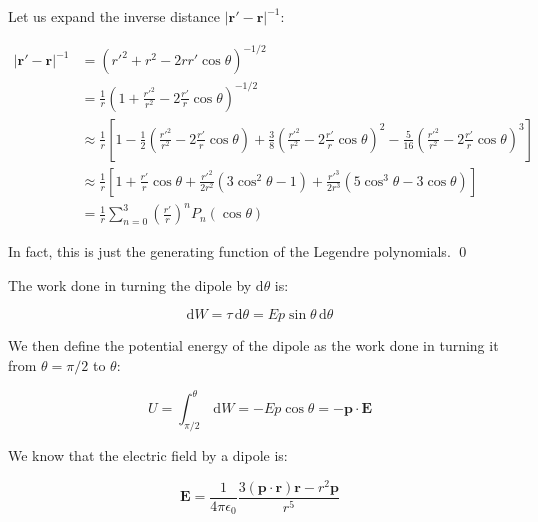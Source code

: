\documentclass[12pt]{article}
\begin{document}
Let us expand the inverse distance $\left\lvert \mathbf{r}' - \mathbf{r} \right\rvert^{-1}$:

\begin{equation}
\begin{split}
    \left\lvert \mathbf{r}' - \mathbf{r} \right\rvert^{-1} &= \left( r'^2 + r^2 - 2rr' \cos{\theta} \right)^{-1/2} \\
    &= \frac{1}{r} \left( 1 + \frac{r'^{2}}{r^{2}}  - 2 \frac{r'}{r} \cos{\theta} \right)^{-1/2} \\
    &\approx \frac{1}{r} \left[ 1 - \frac{1}{2} \left( \frac{r'^{2}}{r^{2}}  - 2 \frac{r'}{r} \cos{\theta} \right) + \frac{3}{8} \left( \frac{r'^{2}}{r^{2}}  - 2 \frac{r'}{r} \cos{\theta} \right)^{2} - \frac{5}{16} \left( \frac{r'^{2}}{r^{2}}  - 2 \frac{r'}{r} \cos{\theta} \right)^{3} \right] \\
    &\approx \frac{1}{r} \left[ 1 + \frac{r'}{r} \cos{\theta} + \frac{r'^{2}}{2r^{2}} \left( 3 \cos^{2}{\theta} - 1 \right) + \frac{r'^{3}}{2r^{3}} \left( 5 \cos^{3}{\theta} - 3 \cos{\theta} \right) \right] \\
    &= \frac{1}{r} \sum_{n=0}^{3} \left( \frac{r'}{r} \right)^{n} P_{n}(\cos{\theta})
\end{split}
\end{equation}

In fact, this is just the generating function of the Legendre polynomials.
\qed



The work done in turning the dipole by $\mathrm{d}\theta$ is:

\begin{equation}
    \mathrm{d}W = \tau \, \mathrm{d}\theta = Ep \sin{\theta} \, \mathrm{d}\theta
\end{equation}

We then define the potential energy of the dipole as the work done in turning it from $\theta = \pi/2$ to $\theta$:

\begin{equation}
    U = \int_{\pi/2}^{\theta} \, \mathrm{d}W = -Ep \cos{\theta} = -\mathbf{p} \cdot \mathbf{E}
\end{equation}

We know that the electric field by a dipole is:

\begin{equation}
    \mathbf{E} = \frac{1}{4\pi\epsilon_{0}} \frac{3(\mathbf{p} \cdot \mathbf{r}) \mathbf{r} - r^{2} \mathbf{p}}{r^{5}}
\end{equation}
\end{document}
